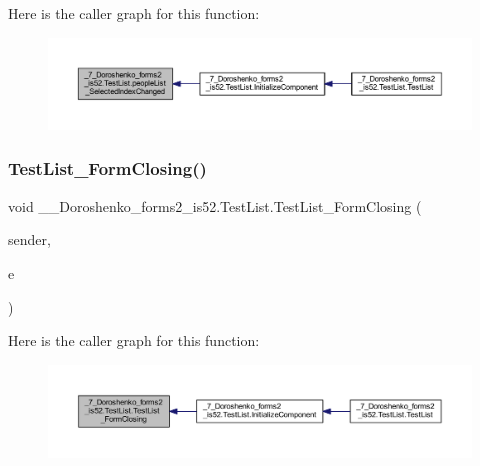 Here is the caller graph for this function\+:
\nopagebreak
\begin{figure}[H]
\begin{center}
\leavevmode
\includegraphics[width=350pt]{class__7___doroshenko__forms2__is52_1_1_test_list_a266dce962f1c7c8a005ab5548e21c56a_icgraph}
\end{center}
\end{figure}
\hypertarget{class__7___doroshenko__forms2__is52_1_1_test_list_a9b0f78bfb7c87b9208104bbe129ddd22}{}\label{class__7___doroshenko__forms2__is52_1_1_test_list_a9b0f78bfb7c87b9208104bbe129ddd22} 
\subsubsection{\texorpdfstring{Test\+List\+\_\+\+Form\+Closing()}{TestList\_FormClosing()}}
{\footnotesize\ttfamily void \+\_\+\_\+\+Doroshenko\+\_\+forms2\+\_\+is52.\+Test\+List.\+Test\+List\+\_\+\+Form\+Closing (\begin{DoxyParamCaption}\item[{object}]{sender,  }\item[{Form\+Closing\+Event\+Args}]{e }\end{DoxyParamCaption})\hspace{0.3cm}{\ttfamily [private]}}

Here is the caller graph for this function\+:
\nopagebreak
\begin{figure}[H]
\begin{center}
\leavevmode
\includegraphics[width=350pt]{class__7___doroshenko__forms2__is52_1_1_test_list_a9b0f78bfb7c87b9208104bbe129ddd22_icgraph}
\end{center}
\end{figure}
\hypertarget{class__7___doroshenko__forms2__is52_1_1_test_list_afcb94184c5a8e2b33b48961aee888668}{}\label{class__7___doroshenko__forms2__is52_1_1_test_list_afcb94184c5a8e2b33b48961aee888668} 
